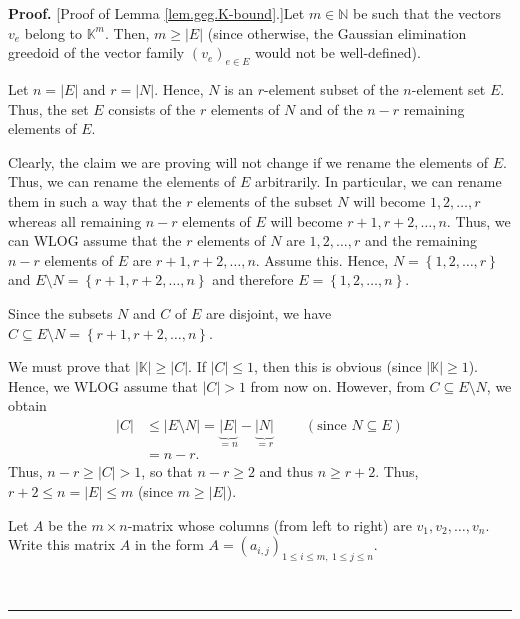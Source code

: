 \documentclass[numbers=enddot,12pt,final,onecolumn,notitlepage]{scrartcl}%
\theoremstyle{definition}
\newenvironment{proof}[1][Proof]{\noindent\textbf{#1.} }{\ \rule{0.5em}{0.5em}}
\renewcommand{\leq}{\leqslant}
\renewcommand{\geq}{\geqslant}
\theoremstyle{plainsl}
\begin{document}
\begin{proof}
[Proof of Lemma \ref{lem.geg.K-bound}.]Let $m\in\mathbb{N}$ be such that the
vectors $v_{e}$ belong to $\mathbb{K}^{m}$. Then, $m\geq\left\vert
E\right\vert $ (since otherwise, the Gaussian elimination greedoid of the
vector family $\left(  v_{e}\right)  _{e\in E}$ would not be well-defined).

Let $n=\left\vert E\right\vert $ and $r=\left\vert N\right\vert $. Hence, $N$
is an $r$-element subset of the $n$-element set $E$. Thus, the set $E$
consists of the $r$ elements of $N$ and of the $n-r$ remaining elements of $E$.

Clearly, the claim we are proving will not change if we rename the elements of
$E$. Thus, we can rename the elements of $E$ arbitrarily. In particular, we
can rename them in such a way that the $r$ elements of the subset $N$ will
become $1,2,\ldots,r$ whereas all remaining $n-r$ elements of $E$ will become
$r+1,r+2,\ldots,n$. Thus, we can WLOG assume that the $r$ elements of $N$ are
$1,2,\ldots,r$ and the remaining $n-r$ elements of $E$ are $r+1,r+2,\ldots,n$.
Assume this. Hence, $N=\left\{  1,2,\ldots,r\right\}  $ and $E\setminus
N=\left\{  r+1,r+2,\ldots,n\right\}  $ and therefore $E=\left\{
1,2,\ldots,n\right\}  $.

Since the subsets $N$ and $C$ of $E$ are disjoint, we have $C\subseteq
E\setminus N=\left\{  r+1,r+2,\ldots,n\right\}  $.

We must prove that $\left\vert \mathbb{K}\right\vert \geq\left\vert
C\right\vert $. If $\left\vert C\right\vert \leq1$, then this is obvious
(since $\left\vert \mathbb{K}\right\vert \geq1$). Hence, we WLOG assume that
$\left\vert C\right\vert >1$ from now on. However, from $C\subseteq E\setminus
N$, we obtain
\begin{align*}
\left\vert C\right\vert  &  \leq\left\vert E\setminus N\right\vert
=\underbrace{\left\vert E\right\vert }_{=n}-\underbrace{\left\vert
N\right\vert }_{=r}\ \ \ \ \ \ \ \ \ \ \left(  \text{since }N\subseteq
E\right) \\
&  =n-r.
\end{align*}
Thus, $n-r\geq\left\vert C\right\vert >1$, so that $n-r\geq2$ and thus $n\geq
r+2$. Thus, $r+2\leq n=\left\vert E\right\vert \leq m$ (since $m\geq\left\vert
E\right\vert $).

Let $A$ be the $m\times n$-matrix whose columns (from left to right) are
$v_{1},v_{2},\ldots,v_{n}$. Write this matrix $A$ in the form $A=\left(
a_{i,j}\right)  _{1\leq i\leq m,\ 1\leq j\leq n}$.


\end{proof}
\end{document}
